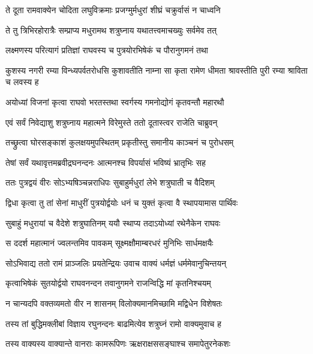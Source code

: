 
\twolineshloka
{ते दूता रामवाक्येन चोदिता लघुविक्रमाः}
{प्रजग्मुर्मधुरां शीघ्रं चक्रुर्वासं न चाध्वनि} %

\twolineshloka
{ते तु त्रिभिरहोरात्रैः सम्प्राप्य मधुरामथ}
{शत्रुघ्नाय यथातत्त्वमाचख्युः सर्वमेव तत्} %

\twolineshloka
{लक्ष्मणस्य परित्यागं प्रतिज्ञां राघवस्य च}
{पुत्रयोरभिषेकं च पौरानुगमनं तथा} %

\threelineshloka
{कुशस्य नगरी रम्या विन्ध्यपर्वतरोधसि}
{कुशावतीति नाम्ना सा कृता रामेण धीमता}
{श्रावस्तीति पुरी रम्या श्राविता च लवस्य ह} %

\twolineshloka
{अयोध्यां विजनां कृत्वा राघवो भरतस्तथा}
{स्वर्गस्य गमनोद्योगं कृतवन्तौ महारथौ} %

\twolineshloka
{एवं सर्वं निवेद्याशु शत्रुघ्नाय महात्मने}
{विरेमुस्ते ततो दूतास्त्वर राजेति चाब्रुवन्} %

\twolineshloka
{तच्छ्रुत्वा घोरसङ्काशं कुलक्षयमुपस्थितम्}
{प्रकृतीस्तु समानीय काञ्चनं च पुरोधसम्} %

\twolineshloka
{तेषां सर्वं यथावृत्तमब्रवीद्रघनन्दनः}
{आत्मनश्च विपर्यासं भविष्यं भ्रातृभिः सह} %

\twolineshloka
{ततः पुत्रद्वयं वीरः सोऽभ्यषिञ्चन्नराधिपः}
{सुबाहुर्मधुरां लेभे शत्रुघाती च वैदिशम्} %

\twolineshloka
{द्विधा कृत्वा तु तां सेनां माधुरीं पुत्रयोर्द्वयोः}
{धनं च युक्तं कृत्वा वै स्थापयामास पार्थिवः} %

\twolineshloka
{सुबाहुं मधुरायां च वैदेशे शत्रुघातिनम्}
{ययौ स्थाप्य तदाऽयोध्यां रथेनैकेन राघवः} %

\twolineshloka
{स ददर्श महात्मानं ज्वलन्तमिव पावकम्}
{सूक्ष्मक्षौमाम्बरधरं मुनिभिः सार्धमक्षयैः} %

\twolineshloka
{सोऽभिवाद्य ततो रामं प्राञ्जलिः प्रयतेन्द्रियः}
{उवाच वाक्यं धर्मज्ञं धर्ममेवानुचिन्तयन्} %

\twolineshloka
{कृत्वाभिषेकं सुतयोर्द्वयो राघवनन्दन}
{तवानुगमने राजन्विद्धि मां कृतनिश्चयम्} %

\twolineshloka
{न चान्यदपि वक्तव्यमतो वीर न शासनम्}
{विलोक्यमानमिच्छामि मद्विधेन विशेषतः} %

\twolineshloka
{तस्य तां बुद्धिमक्लीबां विज्ञाय रघुनन्दनः}
{बाढमित्येव शत्रुघ्नं रामो वाक्यमुवाच ह} %

\twolineshloka
{तस्य वाक्यस्य वाक्यान्ते वानराः कामरूपिणः}
{ऋक्षराक्षससङ्घाश्च समापेतुरनेकशः} %

